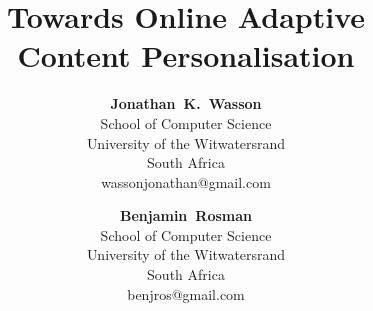 \documentclass[11pt, conference, compsoc]{IEEEtran}
\begin{document}
%
\title{Towards Online Adaptive \\ Content Personalisation}
%
%
%
%

\author{\textbf{Jonathan~K.~Wasson}\\
School of Computer Science\\
University of the Witwatersrand\\
South Africa\\
wassonjonathan@gmail.com
\and
\textbf{Benjamin~Rosman}\\
School of Computer Science\\
University of the Witwatersrand\\
South Africa\\
benjros@gmail.com

}

% 
%
\end{document}
